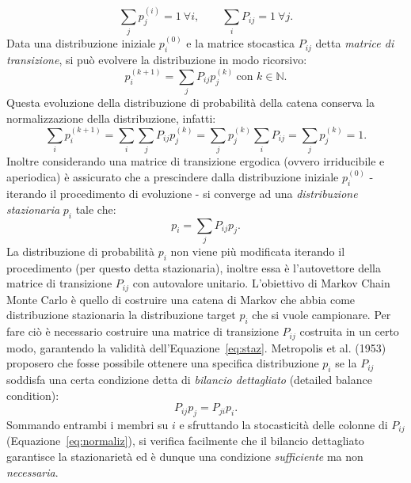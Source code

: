 \begin{equation}
    \label{eq:normaliz}
\sum_{j} p^{(i)}_j = 1 \ \forall i, \qquad \sum_{i} P_{ij} =1 \ \forall j.
\end{equation} Data una distribuzione iniziale $p^{(0)}_i$ e la matrice stocastica $P_{ij}$ detta \emph{matrice di transizione}, si può evolvere la distribuzione in modo ricorsivo:
\begin{equation}
    \label{eq:evol}
    p^{(k+1)}_i = \sum_{j} P_{ij} p^{(k)}_j  \ \text{con } k \in \mathbb{N}.
\end{equation} Questa evoluzione della distribuzione di probabilità della catena conserva la normalizzazione della distribuzione, infatti:
\begin{equation}
\sum_{i} p^{(k+1)}_i = \sum_{i} \sum_{j} P_{ij} p^{(k)}_j = \sum_{j} p^{(k)}_j \sum_{i} P_{ij} = \sum_{j} p^{(k)}_j = 1.
\end{equation} Inoltre considerando una matrice di transizione ergodica (ovvero irriducibile e aperiodica) è assicurato che a prescindere dalla distribuzione iniziale $p^{(0)}_i$ - iterando il procedimento di evoluzione - si converge ad una \emph{distribuzione stazionaria} $p_i$ tale che:
\begin{equation}
    \label{eq:staz}
    p_i = \sum_{j} P_{ij} p_j.
\end{equation}
La distribuzione di probabilità $p_i$ non viene più modificata iterando il procedimento (per questo detta stazionaria), inoltre essa è l'autovettore della matrice di transizione $P_{ij}$ con autovalore unitario.
L'obiettivo di Markov Chain Monte Carlo è quello di costruire una catena di Markov che abbia come distribuzione stazionaria la distribuzione target $p_i$ che si vuole campionare. Per fare ciò è necessario costruire una matrice di transizione $P_{ij}$ costruita in un certo modo, garantendo la validità dell'Equazione~\ref{eq:staz}.
Metropolis et al. (1953) proposero che fosse possibile ottenere una specifica distribuzione $p_i$ se la $P_{ij}$ soddisfa una certa condizione detta di \emph{bilancio dettagliato} (detailed balance condition): 
\begin{equation}
    P_{ij} p_j = P_{ji} p_i.
\end{equation}
Sommando entrambi i membri su $i$ e sfruttando la stocasticità delle colonne di $P_{ij}$ (Equazione~\ref{eq:normaliz}), si verifica facilmente che il bilancio dettagliato garantisce la stazionarietà ed è dunque una condizione \emph{sufficiente} ma non \emph{necessaria}.

